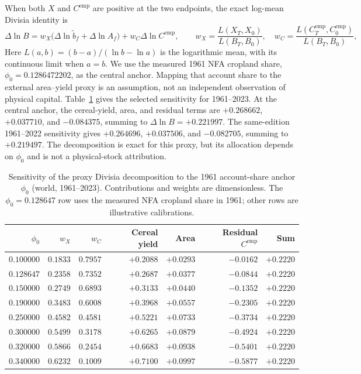 \documentclass[11pt,a4paper]{article}
\begin{document}
When both $X$ and $C^{\mathrm{emp}}$ are positive at the two endpoints, the exact log-mean Divisia identity is
\begin{equation}
\Delta\ln B=w_X\bigl(\Delta\ln\tilde b_f+\Delta\ln A_f\bigr)+w_C\Delta\ln C^{\mathrm{emp}},
\qquad w_X=\frac{L(X_T,X_0)}{L(B_T,B_0)},\quad w_C=\frac{L(C^{\mathrm{emp}}_T,C^{\mathrm{emp}}_0)}{L(B_T,B_0)},
\end{equation}
Here $L(a,b)=(b-a)/(\ln b-\ln a)$ is the logarithmic mean, with its continuous limit when $a=b$. We use the measured 1961 NFA cropland share, $\phi_0=0.1286472202$, as the central anchor. Mapping that account share to the external area--yield proxy is an assumption, not an independent observation of physical capital. Table~\ref{tab:si_phi0} gives the selected sensitivity for 1961--2023. At the central anchor, the cereal-yield, area, and residual terms are $+0.268662$, $+0.037710$, and $-0.084375$, summing to $\Delta\ln B=+0.221997$. The same-edition 1961--2022 sensitivity gives $+0.264696$, $+0.037506$, and $-0.082705$, summing to $+0.219497$. The decomposition is exact for this proxy, but its allocation depends on $\phi_0$ and is not a physical-stock attribution.

\begin{table}[htbp]
\centering\footnotesize
\caption{Sensitivity of the proxy Divisia decomposition to the 1961 account-share anchor $\phi_0$ (world, 1961--2023). Contributions and weights are dimensionless. The $\phi_0=0.128647$ row uses the measured NFA cropland share in 1961; other rows are illustrative calibrations.}
\label{tab:si_phi0}
\begin{tabular}{r r r r r r r}
\toprule
$\phi_0$ & $w_X$ & $w_C$ & Cereal yield & Area & Residual $C^{\mathrm{emp}}$ & Sum \\
\midrule
$0.100000$ & $0.1833$ & $0.7957$ & $+0.2088$ & $+0.0293$ & $-0.0162$ & $+0.2220$ \\
$0.128647$ & $0.2358$ & $0.7352$ & $+0.2687$ & $+0.0377$ & $-0.0844$ & $+0.2220$ \\
$0.150000$ & $0.2749$ & $0.6893$ & $+0.3133$ & $+0.0440$ & $-0.1352$ & $+0.2220$ \\
$0.190000$ & $0.3483$ & $0.6008$ & $+0.3968$ & $+0.0557$ & $-0.2305$ & $+0.2220$ \\
$0.250000$ & $0.4582$ & $0.4581$ & $+0.5221$ & $+0.0733$ & $-0.3734$ & $+0.2220$ \\
$0.300000$ & $0.5499$ & $0.3178$ & $+0.6265$ & $+0.0879$ & $-0.4924$ & $+0.2220$ \\
$0.320000$ & $0.5866$ & $0.2454$ & $+0.6683$ & $+0.0938$ & $-0.5401$ & $+0.2220$ \\
$0.340000$ & $0.6232$ & $0.1009$ & $+0.7100$ & $+0.0997$ & $-0.5877$ & $+0.2220$ \\
\bottomrule
\end{tabular}
\end{table}
\end{document}
